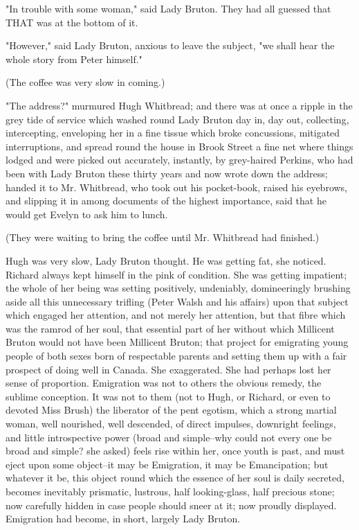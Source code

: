 \documentclass[lang=cn,10pt]{elegantbook}
\begin{document}
"In trouble with some woman," said Lady Bruton.  They had all
guessed that THAT was at the bottom of it.

"However," said Lady Bruton, anxious to leave the subject, "we
shall hear the whole story from Peter himself."

(The coffee was very slow in coming.)

"The address?" murmured Hugh Whitbread; and there was at once a
ripple in the grey tide of service which washed round Lady Bruton
day in, day out, collecting, intercepting, enveloping her in a fine
tissue which broke concussions, mitigated interruptions, and spread
round the house in Brook Street a fine net where things lodged and
were picked out accurately, instantly, by grey-haired Perkins, who
had been with Lady Bruton these thirty years and now wrote down the
address; handed it to Mr. Whitbread, who took out his pocket-book,
raised his eyebrows, and slipping it in among documents of the
highest importance, said that he would get Evelyn to ask him to
lunch.

(They were waiting to bring the coffee until Mr. Whitbread had
finished.)

Hugh was very slow, Lady Bruton thought.  He was getting fat, she
noticed.  Richard always kept himself in the pink of condition.
She was getting impatient; the whole of her being was setting
positively, undeniably, domineeringly brushing aside all this
unnecessary trifling (Peter Walsh and his affairs) upon that
subject which engaged her attention, and not merely her attention,
but that fibre which was the ramrod of her soul, that essential
part of her without which Millicent Bruton would not have been
Millicent Bruton; that project for emigrating young people of both
sexes born of respectable parents and setting them up with a fair
prospect of doing well in Canada.  She exaggerated.  She had
perhaps lost her sense of proportion.  Emigration was not to others
the obvious remedy, the sublime conception.  It was not to them
(not to Hugh, or Richard, or even to devoted Miss Brush) the
liberator of the pent egotism, which a strong martial woman, well
nourished, well descended, of direct impulses, downright feelings,
and little introspective power (broad and simple--why could not
every one be broad and simple? she asked) feels rise within her,
once youth is past, and must eject upon some object--it may be
Emigration, it may be Emancipation; but whatever it be, this object
round which the essence of her soul is daily secreted, becomes
inevitably prismatic, lustrous, half looking-glass, half precious
stone; now carefully hidden in case people should sneer at it; now
proudly displayed.  Emigration had become, in short, largely Lady
Bruton.
\end{document}
